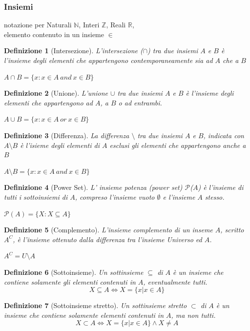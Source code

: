 \documentclass[a4paper]{article}
\newtheorem*{definition}{Definizione}
\begin{document}
\subsubsection{Insiemi}
notazione per Naturali $ \mathbb{N} $, Interi $ \mathbb{Z} $, Reali $ \mathbb{R} $,\\ elemento contenuto in un insieme $ \in $
\newline
\begin{definition}[Intersezione]L'intersezione ($\cap$) tra due insiemi $A$ e $B$ è l'insieme degli elementi che appartengono contemporaneamente sia ad $A$ che a $B$\\ 
	\begin{center}$A \cap B = \{x:x \in A \: and \: x \in B\}$\end{center}
\end{definition}
\begin{definition}[Unione]L'unione $\cup$ tra due insiemi $A$ e $B$ è l'insieme degli elementi che appartengono ad $A$, a $B$ o ad entrambi.
	\begin{center}$A \cup B = \{x:x \in A \: or \: x \in B\}$\end{center}
\end{definition}
\begin{definition}[Differenza]La differenza $\setminus$ tra due insiemi $A$ e $B$, indicata con $A \setminus B$ è l'isieme degli elementi di $A$ esclusi gli elementi che appartengono anche a $B$
	\begin{center}$A \setminus B = \{x:x \in A \: and \: x \in B\}$\end{center}
\end{definition}
\begin{definition}[Power Set]L' insieme potenza (power set) $\mathcal{P}$($A$) è l'insieme di tutti i sottoinsiemi di $A$, compreso l'insieme vuoto $\emptyset$ e l'insieme $A$ stesso.\begin{center} $\mathcal{P}(A)=\{X : X \subseteq A\}$ \end{center}
\end{definition}
\begin{definition}[Complemento]L'insieme complemento di un inseme $A$, scritto $A^{C}$, è l'insieme ottenuto dalla differenza tra l'insieme Universo ed $A$.\begin{center} $A^{C} = U \setminus A$\end{center}
\end{definition}
\begin{definition}[Sottoinsieme]Un sottinsieme $ \subseteq $  di $A$ è un insieme che contiene solamente gli elementi contenuti in $A$, eventualmente tutti.
$$ X \subseteq A \Leftrightarrow X = \{x \vert x \in A \}$$
\end{definition}
\begin{definition}[Sottoinsieme stretto]
Un sottinsieme stretto $ \subset $ di $A$ è un insieme che contiene solamente elementi contenuti in $A$, ma non tutti.
$$ X \subset A \Leftrightarrow X = \{x \vert x \in A \} \land X \neq A$$
\end{definition}
\end{document}
